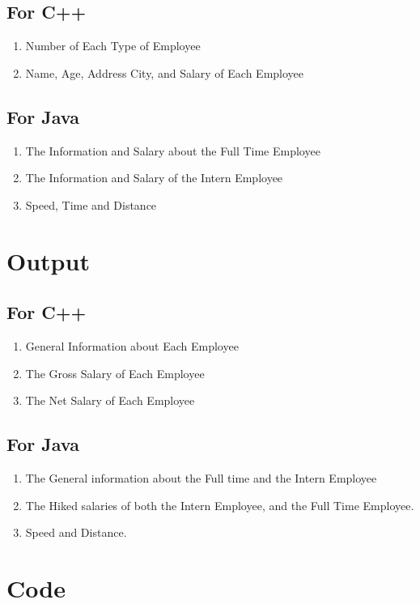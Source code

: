 \documentclass[11pt]{article}
\begin{document}
\subsection*{For C++}
\begin{enumerate}
	\item Number of Each Type of Employee
	\item Name, Age, Address City, and Salary of Each Employee
\end{enumerate}

\subsection*{For Java}
\begin{enumerate}
	\item The Information and Salary about the Full Time Employee
	\item The Information and Salary of the Intern Employee
	\item Speed, Time and Distance
\end{enumerate}

\section{Output}
\subsection*{For C++}
\begin{enumerate}
	\item General Information about Each Employee
	\item The Gross Salary of Each Employee
	\item The Net Salary of Each Employee
\end{enumerate}

\subsection*{For Java}
\begin{enumerate}
	\item The General information about the Full time and the Intern Employee
	\item The Hiked salaries of both the Intern Employee, and the Full Time Employee.
	\item Speed and Distance.
\end{enumerate}


\section{Code}
\end{document}
